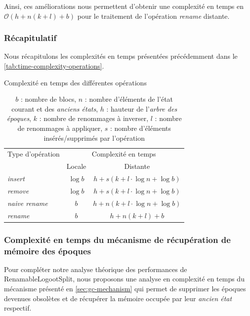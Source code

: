 \documentclass[12pt]{thesul}
\newcommand\bigO[1]{$\mathcal{O}(#1)$}
\begin{document}
Ainsi, ces améliorations nous permettent d'obtenir une complexité en temps en \bigO{h + n (k + l) + b} pour le traitement de l'opération \emph{rename} distante.

\subsubsection{Récapitulatif}

Nous récapitulons les complexités en temps présentées précédemment dans le \autoref{tab:time-complexity-operations}.

\begin{table}[!ht]
  \centering
  \caption{Complexité en temps des différentes opérations}
  \label{tab:time-complexity-operations}
  \begin{tabular}{lcc}
      \toprule
      Type d'opération & \multicolumn{2}{c}{Complexité en temps} \\
      \cmidrule(lr){2-3}
        & Locale &   Distante \\
      \midrule
      \emph{insert} & $\log{}b$ & $h + s (k + l \cdot \log{}n + \log{}b)$ \\
      \emph{remove} & $\log{}b$ & $h + s (k + l \cdot \log{}n + \log{}b)$ \\
      \emph{naive rename} & $b$ & $h + n (k + l \cdot \log{}n + \log{}b)$ \\
      \emph{rename} & $b$ & $h + n (k + l) + b$ \\
      \bottomrule
  \end{tabular}
  \caption*{$b$ : nombre de blocs, $n$ : nombre d'éléments de l'état courant et des \emph{anciens états}, $h$ : hauteur de l'\emph{arbre des époques}, $k$ : nombre de renommages à inverser, $l$ : nombre de renommages à appliquer, $s$ : nombre d'éléments insérés/supprimés par l'opération}
\end{table}

\subsubsection{Complexité en temps du mécanisme de récupération de mémoire des époques}


Pour compléter notre analyse théorique des performances de RenamableLogootSplit, nous proposons une analyse en complexité en temps du mécanisme présenté en \autoref{sec:gc-mechanism} qui permet de supprimer les époques devenues obsolètes et de récupérer la mémoire occupée par leur \emph{ancien état} respectif.
\end{document}
